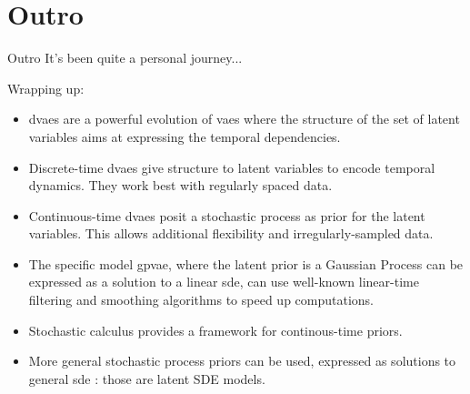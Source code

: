 \section{Outro}\label{outro}

\begin{frame}{Outro}
    It's been quite a personal journey...

Wrapping up:

    \begin{itemize}
        \item \glspl{dvae} are a powerful evolution of \glspl{vae} where the structure of the set of latent variables 
        aims at expressing the temporal dependencies.
        \item Discrete-time \glspl{dvae} give structure to latent variables to encode temporal dynamics. They work best with regularly spaced data.
        \item Continuous-time \glspl{dvae} posit a stochastic process as prior for the latent variables. This allows 
        additional flexibility and irregularly-sampled data.
        \item The specific model \gls{gpvae}, where the latent prior is a Gaussian Process can be expressed as a 
        solution to a linear \gls{sde}, can use well-known linear-time filtering and smoothing algorithms to speed up 
        computations.
        \item Stochastic calculus provides a framework for continous-time priors.
        \item More general stochastic process priors can be used, expressed as solutions to general \gls{sde} :
        those are latent SDE models.
    \end{itemize}
\end{frame}